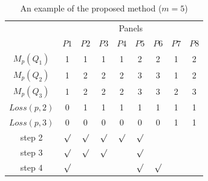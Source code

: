 \documentclass[conference]{IEEEtran}
\begin{document}
\begin{table}[t]
\caption{An example of the proposed method ($m = 5$)}
\begin{center}
\begin{tabular}{c|c|ccccc|cc}\hline \hline
                               & \multicolumn{8}{c}{Panels}  \\
                               &  \multicolumn{1}{c}{$P1$}    & $P2$   & $P3$    & $P4$    & $P5$   & \multicolumn{1}{c}{$P6$}            & $P7$ & $P8$             \\ \hline
$M_{p}(Q_1)$        & 1     & 1     & 1     & 1     & 2    & 2  & 1  & 2              \\ \hline
$M_{p}(Q_2)$        & 1     & 2     & 2     & 2     & 3    & 3  & 1  & 2              \\ \hline
$M_{p}(Q_3)$        & 1     & 2     & 2     & 2     & 3    & 3  & 2  & 3              \\ \hline
$Loss(p,2)$           & 0     & 1     & 1     & 1     & 1    & 1  & 1  & 1    \\ \hline
$Loss(p,3)$           & 0     & 0     & 0     & 0     & 0    & 0  & 1  & 1    \\ \hline\hline
step 2        & $\surd$ & $\surd$ &$\surd$ &$\surd$ &$\surd$ & & & \\ \hline
step 3      & $\surd$ & $\surd$ &$\surd$ & &$\surd$ & & & \\ \hline
step 4       & $\surd$ &  & & &$\surd$ & $\surd$ & & \\ \hline         
\end{tabular}
\end{center}
\label{tab:proposed-example}
\end{table}


\end{document}
